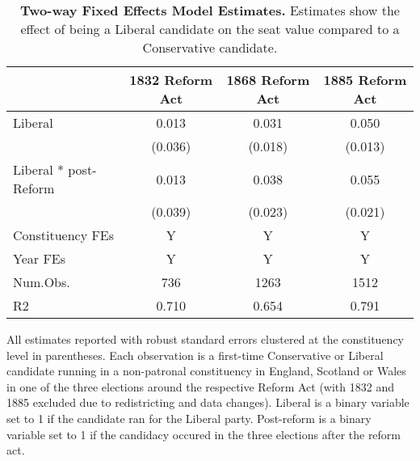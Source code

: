 \begin{table}

\caption{\textbf{Two-way Fixed Effects Model Estimates.} Estimates show the effect of being a Liberal candidate on the seat value compared to a Conservative candidate. \label{tab:newcand_did}}
\centering
\begin{threeparttable}
\begin{tabular}[t]{lccc}
\toprule
  & 1832 Reform Act & 1868 Reform Act & 1885 Reform Act\\
\midrule
Liberal & \num{0.013} & \num{0.031} & \num{0.050}\\
 & (\num{0.036}) & (\num{0.018}) & (\num{0.013})\\
\addlinespace
Liberal * post-Reform & \num{0.013} & \num{0.038} & \num{0.055}\\
 & (\num{0.039}) & (\num{0.023}) & (\num{0.021})\\
\midrule
\midrule
Constituency FEs & Y & Y & Y\\
Year FEs & Y & Y & Y\\
Num.Obs. & \num{736} & \num{1263} & \num{1512}\\
R2 & \num{0.710} & \num{0.654} & \num{0.791}\\
\bottomrule
\end{tabular}
\begin{tablenotes}[para]
\item All estimates reported with robust standard errors clustered at the constituency level in parentheses. Each observation is a first-time Conservative or Liberal candidate running in a non-patronal constituency in England, Scotland or Wales in one of the three elections around the respective Reform Act (with 1832 and 1885 excluded due to redistricting and data changes). Liberal is a binary variable set to 1 if the candidate ran for the Liberal party. Post-reform is a binary variable set to 1 if the candidacy occured in the three elections after the reform act.
\end{tablenotes}
\end{threeparttable}
\end{table}